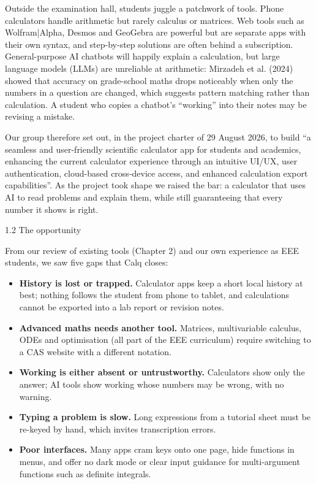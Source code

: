 \documentclass[12pt]{article}
\newcommand{\Htwo}[2]{\par\needspace{5\baselineskip}\vspace{6pt}\phantomsection\addcontentsline{toc}{subsection}{#2}%
  {\fontsize{16}{20}\selectfont\color{head}#1\par}\nopagebreak}
\begin{document}
Outside the examination hall, students juggle a patchwork of tools. Phone calculators handle arithmetic but rarely calculus or matrices. Web tools such as Wolfram|Alpha, Desmos and GeoGebra are powerful but are separate apps with their own syntax, and step-by-step solutions are often behind a subscription. General-purpose AI chatbots will happily explain a calculation, but large language models (LLMs) are unreliable at arithmetic: Mirzadeh et al. (2024) showed that accuracy on grade-school maths drops noticeably when only the numbers in a question are changed, which suggests pattern matching rather than calculation. A student who copies a chatbot’s “working” into their notes may be revising a mistake.

Our group therefore set out, in the project charter of 29 August 2026, to build “a seamless and user-friendly scientific calculator app for students and academics, enhancing the current calculator experience through an intuitive UI/UX, user authentication, cloud-based cross-device access, and enhanced calculation export capabilities”. As the project took shape we raised the bar: a calculator that uses AI to read problems and explain them, while still guaranteeing that every number it shows is right.

\Htwo{1.2 The opportunity}{1.2 The opportunity}

From our review of existing tools (Chapter 2) and our own experience as EEE students, we saw five gaps that Calq closes:

\begin{itemize}
\item \textbf{History is lost or trapped.} Calculator apps keep a short local history at best; nothing follows the student from phone to tablet, and calculations cannot be exported into a lab report or revision notes.
\item \textbf{Advanced maths needs another tool.} Matrices, multivariable calculus, ODEs and optimisation (all part of the EEE curriculum) require switching to a CAS website with a different notation.
\item \textbf{Working is either absent or untrustworthy.} Calculators show only the answer; AI tools show working whose numbers may be wrong, with no warning.
\item \textbf{Typing a problem is slow.} Long expressions from a tutorial sheet must be re-keyed by hand, which invites transcription errors.
\item \textbf{Poor interfaces.} Many apps cram keys onto one page, hide functions in menus, and offer no dark mode or clear input guidance for multi-argument functions such as definite integrals.
\end{itemize}
\end{document}
